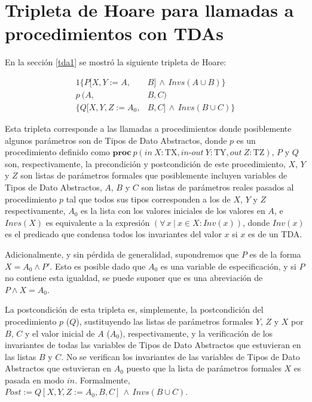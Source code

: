 \chapter{Tripleta de Hoare para llamadas a procedimientos con TDAs}
\label{derivhoare}

En la sección \ref{tda1} se mostró la siguiente tripleta de Hoare:

\begin{alignat}{1}%
  \{ P[X,Y:=A,&B]\, \land \, Invs(A \cup B)\} \nonumber \\
  p\  (A,&B,C) \label{eqn:tdatriple2} \\ 
  \{ Q[X,Y,Z:=A_0,&B,C]\, \land \, Invs(B \cup C)\} \nonumber
\end{alignat}

Esta tripleta corresponde a las llamadas a procedimientos donde  posiblemente
algunos parámetros son de Tipos de Dato Abstractos, donde $p$ es un
procedimiento definido como $\textbf{proc}\ p (in\ X : \textrm{TX},
in\textrm{-}out\ Y : \textrm{TY}, out\ Z : \textrm{TZ})$, $P$ y $Q$ son,
respectivamente, la precondición y postcondición de este procedimiento, $X$, $Y$
y $Z$ son listas de parámetros formales que posiblemente incluyen variables de
Tipos de Dato Abstractos, $A$, $B$ y $C$ son listas de parámetros reales pasados
al procedimiento $p$ tal que todos sus tipos corresponden a los de $X$, $Y$ y
$Z$ respectivamente, $A_0$ es la lista con los valores iniciales de los valores
en $A$, e $Invs(X)$ es equivalente a la expresión 
$(\forall\, x\ |\ x \in X : Inv(x) )$, donde $Inv(x)$ es el predicado que 
condensa todos los invariantes del valor $x$ si $x$ es de un TDA.

Adicionalmente, y sin pérdida de generalidad, supondremos que $P$ es de la forma $X = A_0 \land P'$. Esto es posible dado que $A_0$ es una variable de 
especificación, y si $P$ no contiene esta igualdad, se puede suponer que es
una abreviación de $P \land X = A_0$.

La postcondición de esta tripleta es, simplemente, la postcondición del procedimiento $p$ ($Q$), sustituyendo las listas de parámetros formales $Y$, $Z$ y $X$ por $B$, $C$ y el valor inicial de $A$ ($A_0$), respectivamente, y la verificación de los invariantes de todas las variables de Tipos de Dato Abstractos que estuvieran en las listas $B$ y $C$. No se verifican los 
invariantes de las variables de Tipos de Dato Abstractos que estuvieran en 
$A_0$ puesto que la lista de parámetros formales $X$ es pasada en modo $in$. Formalmente, $Post := Q[X,Y,Z := A_0,B,C]\, \land \, Invs(B \cup C)$.

